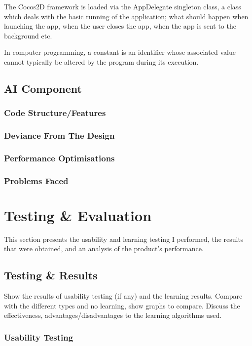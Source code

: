\documentclass[a4paper,oneside]{report}
\begin{document}
The Cocos2D framework is loaded via the AppDelegate singleton class, a class which deals with the basic running of the application; what should happen when launching the app, when the user closes the app, when the app is sent to the background etc.

In computer programming, a constant is an identifier whose associated value cannot typically be altered by the program during its execution.

\chapter{AI Component}

\section{Code Structure/Features}

\section{Deviance From The Design}
	
\section{Performance Optimisations}

\section{Problems Faced}
	
%
%
\part{Testing \& Evaluation}{This section presents the usability and learning testing I performed, the results that were obtained, and an analysis of the product's performance.}

\chapter{Testing \& Results}

Show the results of usability testing (if any) and the learning results. Compare with the different types and no learning, show graphs to compare. Discuss the effectiveness, advantages/disadvantages to the learning algorithms used.

\section{Usability Testing}
\end{document}
